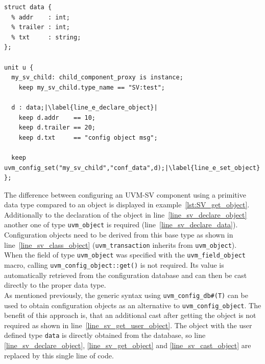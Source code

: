 \lstset{language=e, numbers = left, escapechar=|, breaklines=true}
\begin{lstlisting}[frame=htrbl, caption={e: register an object in configuration database}, label={lst:e_set_object}]
struct data {
  % addr    : int;
  % trailer : int;
  % txt     : string;
};

unit u {
  my_sv_child: child_component_proxy is instance;
    keep my_sv_child.type_name == "SV:test";
  
  d : data;|\label{line_e_declare_object}|
    keep d.addr    == 10;
    keep d.trailer == 20;
    keep d.txt     == "config object msg";

  keep uvm_config_set("my_sv_child","conf_data",d);|\label{line_e_set_object}|
};
\end{lstlisting}
The difference between configuring an UVM-SV component using a primitive data type compared to an object
is displayed in example~\ref{lst:SV_get_object}. Additionally to the declaration of the object in
line~\ref{line_sv_declare_object} another one of type \lstinline$uvm_object$ is required
(line~\ref{line_sv_declare_data}). Configuration objects need to be derived from this base type as shown in
line~\ref{line_sv_class_object} (\lstinline$uvm_transaction$ inherits from \lstinline$uvm_object$).\\
When the field of type \lstinline$uvm_object$ was specified with the \lstinline$uvm_field_object$ macro, calling
\lstinline$uvm_config_object::get()$ is not required. Its value is automatically retrieved from the configuration
database and can then be cast directly to the proper data type.\\
As mentioned previously, the generic syntax using \lstinline$uvm_config_db#(T)$ can be used to obtain configuration
objects as an alternative to \lstinline$uvm_config_object$.
The benefit of this approach is, that an additional cast after getting the object is not required as shown in
line~\ref{line_sv_get_user_object}. The object with the user defined type \lstinline$data$ is directly obtained from
the database, so line \ref{line_sv_declare_object}, \ref{line_sv_get_object} and \ref{line_sv_cast_object} are replaced
by this single line of code.

